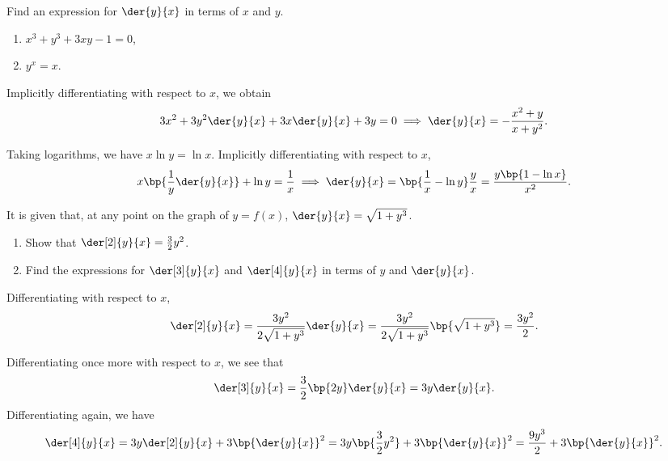 \begin{problem}
    Find an expression for $\der{y}{x}$ in terms of $x$ and $y$.
    \begin{enumerate}
        \item $x^3 + y^3 + 3xy -1 = 0$,
        \item $y^x = x$.
    \end{enumerate}
\end{problem}
\begin{solution}
    \begin{ppart}
        Implicitly differentiating with respect to $x$, we obtain \[3x^2 + 3y^2 \der{y}{x} + 3x \der{y}{x} + 3y = 0 \implies \der{y}{x} = -\frac{x^2 + y}{x + y^2}.\]
    \end{ppart}
    \begin{ppart}
        Taking logarithms, we have $x \ln y = \ln x$. Implicitly differentiating with respect to $x$, \[x \bp{\frac1y \der{y}{x}} + \ln y = \frac1x \implies \der{y}{x} = \bp{\frac1x - \ln y} \frac{y}{x} = \frac{y \bp{1 - \ln x}}{x^2}.\]
    \end{ppart}
\end{solution}

\begin{problem}
    It is given that, at any point on the graph of $y = f(x)$, $\der{y}{x} = \sqrt{1 + y^3}$.
    \begin{enumerate}
        \item Show that $\der[2]{y}{x} = \frac32 y^2$.
        \item Find the expressions for $\der[3]{y}{x}$ and $\der[4]{y}{x}$ in terms of $y$ and $\der{y}{x}$.
    \end{enumerate}
\end{problem}
\begin{solution}
    \begin{ppart}
        Differentiating with respect to $x$, \[\der[2]{y}{x} = \frac{3y^2}{2\sqrt{1 + y^3}} \der{y}{x} = \frac{3y^2}{2\sqrt{1 + y^3}} \bp{\sqrt{1 + y^3}} = \frac{3y^2}{2}.\]
    \end{ppart}
    \begin{ppart}
        Differentiating once more with respect to $x$, we see that \[\der[3]{y}{x} = \frac{3}{2} \bp{2y} \der{y}{x} = 3y \der{y}{x}.\] Differentiating again, we have \[\der[4]{y}{x} = 3y \der[2]{y}{x} + 3\bp{\der{y}{x}}^2 = 3y\bp{\frac32 y^2} + 3\bp{\der{y}{x}}^2 = \frac{9y^3}{2} + 3\bp{\der{y}{x}}^2.\]
    \end{ppart}
\end{solution}
\clearpage

